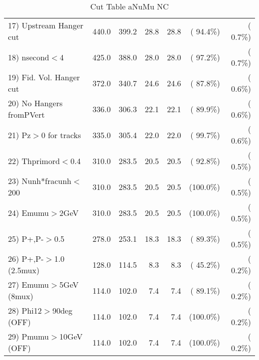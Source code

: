 \begin{table}[h!]
\begin{tabular}{||l||r|r|r|r|r|r||}
 17) Upstream Hanger cut  &        440.0 &        399.2 &         28.8 &         28.8 & ( 94.4\%) & (  0.7\%) \\
 18) nsecond$<$4          &        425.0 &        388.0 &         28.0 &         28.0 & ( 97.2\%) & (  0.7\%) \\
 19) Fid. Vol. Hanger cut &        372.0 &        340.7 &         24.6 &         24.6 & ( 87.8\%) & (  0.6\%) \\
 20) No Hangers fromPVert &        336.0 &        306.3 &         22.1 &         22.1 & ( 89.9\%) & (  0.6\%) \\
 21) Pz$>$0 for tracks    &        335.0 &        305.4 &         22.0 &         22.0 & ( 99.7\%) & (  0.6\%) \\
 22) Thprimord$<$0.4      &        310.0 &        283.5 &         20.5 &         20.5 & ( 92.8\%) & (  0.5\%) \\
 23) Nunh*fracunh$<$200   &        310.0 &        283.5 &         20.5 &         20.5 & (100.0\%) & (  0.5\%) \\
 24) Emumu$>$2GeV         &        310.0 &        283.5 &         20.5 &         20.5 & (100.0\%) & (  0.5\%) \\
 25) P+,P-$>$0.5          &        278.0 &        253.1 &         18.3 &         18.3 & ( 89.3\%) & (  0.5\%) \\
 26) P+,P-$>$1.0 (2.5mux) &        128.0 &        114.5 &          8.3 &          8.3 & ( 45.2\%) & (  0.2\%) \\
 27) Emumu$>$5GeV  (8mux) &        114.0 &        102.0 &          7.4 &          7.4 & ( 89.1\%) & (  0.2\%) \\
 28) Phi12$>$90deg  (OFF) &        114.0 &        102.0 &          7.4 &          7.4 & (100.0\%) & (  0.2\%) \\
 29) Pmumu$>$10GeV  (OFF) &        114.0 &        102.0 &          7.4 &          7.4 & (100.0\%) & (  0.2\%) \\
 \hline
 \hline
 \end{tabular}
 \caption{Cut Table  aNuMu NC }
 \label{tab-cutcohjpsi-mumu_anumunc}
 \end{table}
